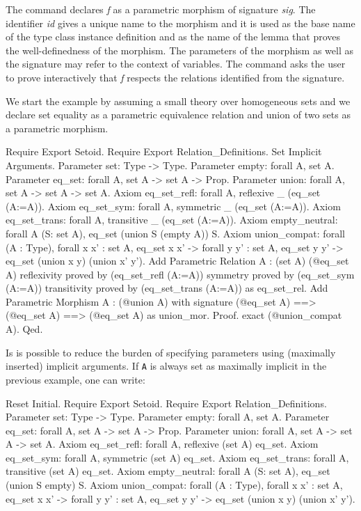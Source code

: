 The command declares \textit{f} as a parametric morphism of signature
\textit{sig}. The identifier \textit{id} gives a unique name to the morphism
and it is used as the base name of the type class instance definition 
and as the name of the lemma that proves the well-definedness of the morphism.
The parameters of the morphism as well as the signature may refer to the
context of variables.
The command asks the user to prove interactively that \textit{f} respects
the relations identified from the signature.

\begin{cscexample}
We start the example by assuming a small theory over homogeneous sets and
we declare set equality as a parametric equivalence relation and
union of two sets as a parametric morphism.
\begin{coq_example*}
Require Export Setoid.
Require Export Relation_Definitions.
Set Implicit Arguments.
Parameter set: Type -> Type.
Parameter empty: forall A, set A.
Parameter eq_set: forall A, set A -> set A -> Prop.
Parameter union: forall A, set A -> set A -> set A.
Axiom eq_set_refl: forall A, reflexive _ (eq_set (A:=A)).
Axiom eq_set_sym: forall A, symmetric _ (eq_set (A:=A)).
Axiom eq_set_trans: forall A, transitive _ (eq_set (A:=A)).
Axiom empty_neutral: forall A (S: set A), eq_set (union S (empty A)) S.
Axiom union_compat:
 forall (A : Type),
  forall x x' : set A, eq_set x x' ->
  forall y y' : set A, eq_set y y' ->
   eq_set (union x y) (union x' y').
Add Parametric Relation A : (set A) (@eq_set A)
 reflexivity proved by (eq_set_refl (A:=A))
 symmetry proved by (eq_set_sym (A:=A))
 transitivity proved by (eq_set_trans (A:=A))
 as eq_set_rel.
Add Parametric Morphism A : (@union A) with 
signature (@eq_set A) ==> (@eq_set A) ==> (@eq_set A) as union_mor.
Proof. exact (@union_compat A). Qed.
\end{coq_example*}

\end{cscexample}

Is is possible to reduce the burden of specifying parameters using
(maximally inserted) implicit arguments. If \texttt{A} is always set as
maximally implicit in the previous example, one can write:

\begin{coq_eval}
Reset Initial.
Require Export Setoid.
Require Export Relation_Definitions.
Parameter set: Type -> Type.
Parameter empty: forall {A}, set A.
Parameter eq_set: forall {A}, set A -> set A -> Prop.
Parameter union: forall {A}, set A -> set A -> set A.
Axiom eq_set_refl: forall {A}, reflexive (set A) eq_set.
Axiom eq_set_sym: forall {A}, symmetric (set A) eq_set.
Axiom eq_set_trans: forall {A}, transitive (set A) eq_set.
Axiom empty_neutral: forall A (S: set A), eq_set (union S empty) S.
Axiom union_compat:
 forall (A : Type),
  forall x x' : set A, eq_set x x' ->
  forall y y' : set A, eq_set y y' ->
   eq_set (union x y) (union x' y').
\end{coq_eval}

